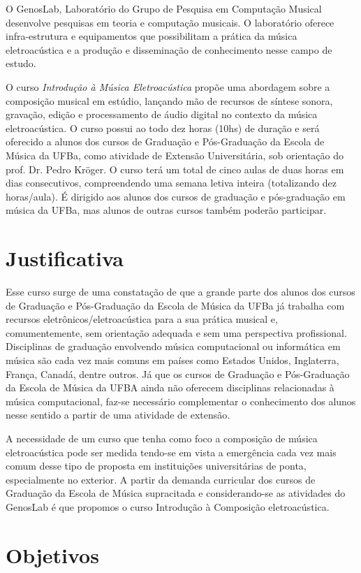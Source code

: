 \documentclass[12pt]{article}
\begin{document}
O GenosLab, Laboratório do Grupo de Pesquisa em Computação Musical
desenvolve pesquisas em teoria e computação musicais. O laboratório
oferece infra-estrutura e equipamentos que possibilitam a prática da
música eletroacústica e a produção e disseminação de conhecimento
nesse campo de estudo.

O curso \textit{Introdução à Música Eletroacústica} propõe uma
abordagem sobre a composição musical em estúdio, lançando mão de
recursos de síntese sonora, gravação, edição e processamento de áudio
digital no contexto da música eletroacústica. O curso possui ao todo
dez horas (10hs) de duração e será oferecido a alunos dos cursos de
Graduação e Pós-Graduação da Escola de Música da UFBa, como atividade
de Extensão Universitária, sob orientação do prof. Dr. Pedro Kröger.
O curso terá um total de cinco aulas de duas horas em dias
consecutivos, compreendendo uma semana letiva inteira (totalizando dez
horas/aula). É dirigido aos alunos dos cursos de graduação e
pós-graduação em música da UFBa, mas alunos de outras cursos também
poderão participar.

\section{Justificativa}

Esse curso surge de uma constatação de que a grande parte dos alunos
dos cursos de Graduação e Pós-Graduação da Escola de Música da UFBa já
trabalha com recursos eletrônicos/eletroacústica para a sua prática
musical e, comumentemente, sem orientação adequada e sem uma
perspectiva profissional. Disciplinas de graduação envolvendo música
computacional ou informática em música são cada vez mais comuns em
países como Estados Unidos, Inglaterra, França, Canadá, dentre
outros. Já que os cursos de Graduação e Pós-Graduação da Escola de
Música da UFBA ainda não oferecem disciplinas relacionadas à música
computacional, faz-se necessário complementar o conhecimento dos
alunos nesse sentido a partir de uma atividade de extensão.

A necessidade de um curso que tenha como foco a composição de música
eletroacústica pode ser medida tendo-se em vista a emergência cada vez
mais comum desse tipo de proposta em instituições universitárias de
ponta, especialmente no exterior. A partir da demanda curricular dos
cursos de Graduação da Escola de Música supracitada e considerando-se
as atividades do GenosLab é que propomos o curso Introdução à
Composição eletroacústica.

\section{Objetivos}
\end{document}
